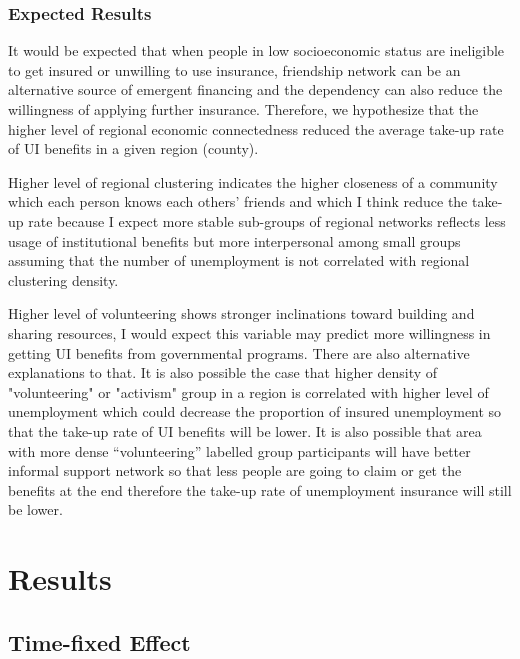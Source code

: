 \documentclass{article}
\begin{document}
\subsubsection{Expected Results}


It would be expected that when people in low socioeconomic status are ineligible to get insured or unwilling to use insurance, friendship network can be an alternative source of emergent financing and the dependency can also reduce the willingness of applying further insurance. Therefore, we hypothesize that the higher level of regional economic connectedness reduced the average take-up rate of UI benefits in a given region (county).

Higher level of regional clustering indicates the higher closeness of a community which each person knows each others' friends and which I think reduce the take-up rate because I expect more stable sub-groups of regional networks reflects less usage of institutional benefits but more interpersonal among small groups assuming that the number of unemployment is not correlated with regional clustering density.

Higher level of volunteering shows stronger inclinations toward building and sharing resources, I would expect this variable may predict more willingness in getting UI benefits from governmental programs. There are also alternative explanations to that. It is also possible the case that higher density of "volunteering" or "activism" group in a region is correlated with higher level of unemployment which could decrease the proportion of insured unemployment so that the take-up rate of UI benefits will be lower. It is also possible that area with more dense ``volunteering'' labelled group participants will have better informal support network so that less people are going to claim or get the benefits at the end therefore the take-up rate of unemployment insurance will still be lower. 

\section{Results}
\subsection{Time-fixed Effect}

\end{document}
